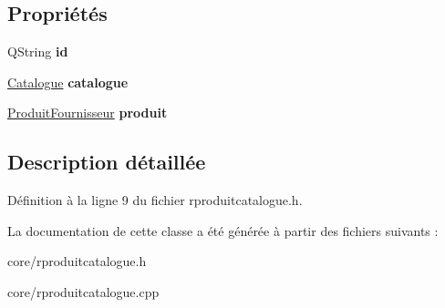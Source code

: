 \subsection*{Propriétés}
\begin{DoxyCompactItemize}
\item 
\hypertarget{class_core_1_1_r_produit_catalogue_a85a088d3320fe97e316088fb7aaf3089}{
QString {\bfseries id}}
\label{dd/da1/class_core_1_1_r_produit_catalogue_a85a088d3320fe97e316088fb7aaf3089}

\item 
\hypertarget{class_core_1_1_r_produit_catalogue_a93913cd4c0bb6ee0c14d5edea3e72262}{
\hyperlink{class_core_1_1_catalogue}{Catalogue} {\bfseries catalogue}}
\label{dd/da1/class_core_1_1_r_produit_catalogue_a93913cd4c0bb6ee0c14d5edea3e72262}

\item 
\hypertarget{class_core_1_1_r_produit_catalogue_a42bd407f297a089a0bfc2767923cb4ae}{
\hyperlink{class_core_1_1_produit_fournisseur}{ProduitFournisseur} {\bfseries produit}}
\label{dd/da1/class_core_1_1_r_produit_catalogue_a42bd407f297a089a0bfc2767923cb4ae}

\end{DoxyCompactItemize}


\subsection{Description détaillée}


Définition à la ligne 9 du fichier rproduitcatalogue.h.



La documentation de cette classe a été générée à partir des fichiers suivants :\begin{DoxyCompactItemize}
\item 
core/rproduitcatalogue.h\item 
core/rproduitcatalogue.cpp\end{DoxyCompactItemize}

